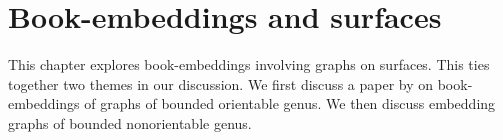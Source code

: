 \chapter{Book-embeddings and surfaces}

This chapter explores book-embeddings involving graphs on surfaces. This ties together two themes in our discussion. We first discuss a paper by \textcite{heathPagenumberGenusGraphs1992} on book-embeddings of graphs of bounded orientable genus. We then discuss embedding graphs of bounded nonorientable genus. 





